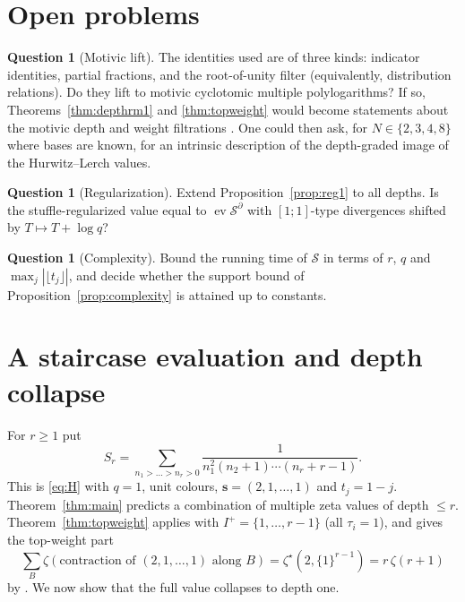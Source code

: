 \documentclass[11pt]{amsart}
\theoremstyle{definition}
\newtheorem{question}[theorem]{Question}
\theoremstyle{remark}
\numberwithin{equation}{section}
\newcommand{\ev}{\operatorname{ev}}
\newcommand{\cS}{\mathcal{S}}
\newcommand{\s}{\mathbf{s}}
\newcommand{\lfl}{\lfloor}
\newcommand{\rfl}{\rfloor}
\begin{document}
\section{Open problems}\label{sec:outlook}

\begin{question}[Motivic lift]
The identities used are of three kinds: indicator identities, partial fractions, and the root-of-unity filter (equivalently, distribution relations). Do they lift to motivic cyclotomic multiple polylogarithms? If so, Theorems~\ref{thm:depthrm1} and \ref{thm:topweight} would become statements about the motivic depth and weight filtrations \cite{Gon98,Del10,Gla16}. One could then ask, for $N\in\{2,3,4,8\}$ where bases are known, for an intrinsic description of the depth-graded image of the Hurwitz--Lerch values.
\end{question}

\begin{question}[Regularization]\label{q:reg}
Extend Proposition~\ref{prop:reg1} to all depths. Is the stuffle-regularized value equal to $\ev\cS^\partial$ with $[1;1]$-type divergences shifted by $T\mapsto T+\log q$?
\end{question}

\begin{question}[Complexity]
Bound the running time of $\cS$ in terms of $r$, $q$ and $\max_j|\lfl t_j\rfl|$, and decide whether the support bound of Proposition~\ref{prop:complexity} is attained up to constants.
\end{question}

\appendix
\section{A staircase evaluation and depth collapse}\label{app:staircase}

For $r\ge1$ put
\begin{equation}\label{eq:Sr}
S_r=\sum_{n_1>\dots>n_r>0}\frac{1}{n_1^2(n_2+1)\cdots(n_r+r-1)} .
\end{equation}
This is \eqref{eq:H} with $q=1$, unit colours, $\s=(2,1,\dots,1)$ and $t_j=1-j$. Theorem~\ref{thm:main} predicts a combination of multiple zeta values of depth $\le r$. Theorem~\ref{thm:topweight} applies with $I^+=\{1,\dots,r-1\}$ (all $\tau_i=1$), and gives the top-weight part
\[
\sum_{B}\zeta(\text{contraction of }(2,1,\dots,1)\text{ along }B)=\zeta^\star(2,\{1\}^{r-1})=r\,\zeta(r+1)
\]
by \cite{OZ08}. We now show that the full value collapses to depth one.
\end{document}
